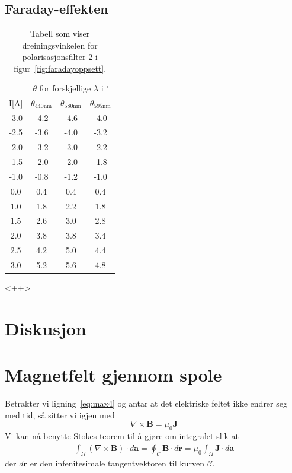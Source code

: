 \documentclass[a4paper,11pt, twocolumn]{article}
\begin{document}
\subsection{Faraday-effekten}
\begin{table}
	\centering
	\caption{Tabell som viser dreiningsvinkelen for polarisasjonsfilter 2 i figur~\ref{fig:faradayoppsett}.}
	\begin{tabular}{cccc}
		\toprule
		\toprule
		& \multicolumn{3}{c}{$\theta$ for forskjellige $\lambda$ i $^\circ$} \\
		I[A] & $\theta_{440\text{nm}}$ & $\theta_{580\text{nm}}$ & $\theta_{595\text{nm}}$ \\
		\toprule
		-3.0 &	-4.2&	-4.6&	-4.0 \\
		-2.5&	-3.6&	-4.0&	-3.2 \\
		-2.0&	-3.2&	-3.0&	-2.2 \\
		-1.5&	-2.0&	-2.0&	-1.8 \\
		-1.0&	-0.8&	-1.2&	-1.0 \\
		0.0&	0.4&	0.4&	0.4 \\
		1.0&	1.8&	2.2&	1.8 \\
		1.5&	2.6&	3.0&	2.8 \\
		2.0&	3.8&	3.8&	3.4 \\
		2.5&	4.2&	5.0&	4.4 \\
		3.0&	5.2&	5.6&	4.8 \\
		\toprule
	\end{tabular}
	\label{tab:<+label+>}
\end{table}<++>
\section{Diskusjon}

\printbibliography
\clearpage
\onecolumn
\appendix


\section{Magnetfelt gjennom spole}
\label{app:magspole}
Betrakter vi ligning~\eqref{eq:max4} og antar at det elektriske feltet ikke endrer seg med tid, så sitter vi igjen med 
\begin{equation}
	\nabla\times\mathbf{B} = \mu_0\mathbf{J}
	\label{eq:independentOfTime}
\end{equation}
Vi kan nå benytte Stokes teorem til å gjøre om integralet slik at
\begin{align}
	\int_\Omega (\nabla\times\mathbf{B})\cdot d\mathbf{a} = \oint_\mathcal{C}\mathbf{B}\cdot d\mathbf{r}=\mu_0\int_\Omega \mathbf{J} \cdot d\mathbf{a} 
	\label{}
\end{align}
der $d\mathbf{r}$ er den infenitesimale tangentvektoren til kurven $\mathcal{C}$. 
\end{document}
